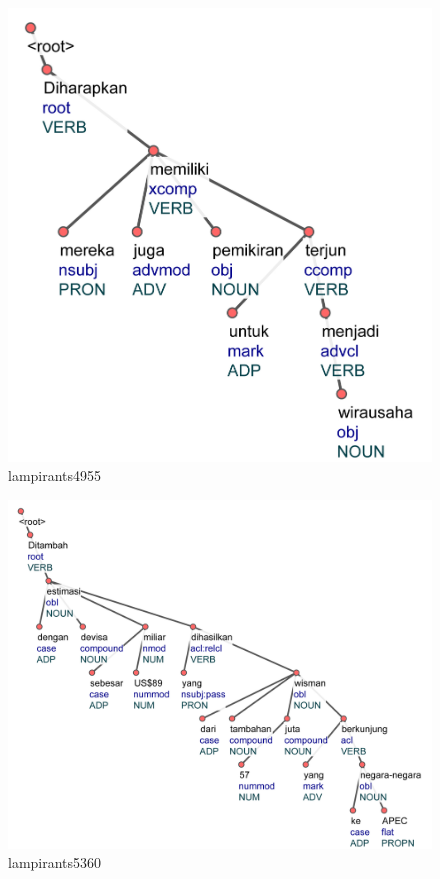 \begin{figure}
	\centering \includegraphics[width=0.8
	\textwidth] {pics/lampiran/lampirants4955.jpg} 
	\caption{lampirants4955} 
	\label{fig:lampirants4955} 
\end{figure}

\begin{figure}
	\centering \includegraphics[width=0.8
	\textwidth] {pics/lampiran/lampirants5360.jpg} 
	\caption{lampirants5360} 
	\label{fig:lampirants5360} 
\end{figure}

